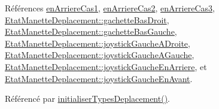 Références \hyperlink{manette_8h_source_l00224}{en\+Arriere\+Cas1}, \hyperlink{manette_8h_source_l00225}{en\+Arriere\+Cas2}, \hyperlink{manette_8h_source_l00226}{en\+Arriere\+Cas3}, \hyperlink{manette_8h_source_l00185}{Etat\+Manette\+Deplacement\+::gachette\+Bas\+Droit}, \hyperlink{manette_8h_source_l00184}{Etat\+Manette\+Deplacement\+::gachette\+Bas\+Gauche}, \hyperlink{manette_8h_source_l00183}{Etat\+Manette\+Deplacement\+::joystick\+Gauche\+A\+Droite}, \hyperlink{manette_8h_source_l00182}{Etat\+Manette\+Deplacement\+::joystick\+Gauche\+A\+Gauche}, \hyperlink{manette_8h_source_l00181}{Etat\+Manette\+Deplacement\+::joystick\+Gauche\+En\+Arriere}, et \hyperlink{manette_8h_source_l00180}{Etat\+Manette\+Deplacement\+::joystick\+Gauche\+En\+Avant}.



Référencé par \hyperlink{manette_8cpp_source_l00085}{initialiser\+Types\+Deplacement()}.


